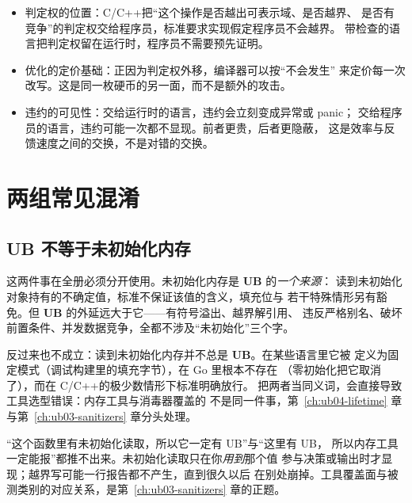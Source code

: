 \documentclass[12pt,a4paper,fontset=fandol]{ctexbook}
\newcommand{\Lang}[1]{\textsf{#1}}
\newcommand{\CL}{\Lang{C}}
\newcommand{\CPP}{\Lang{C++}}
\newcommand{\UB}{\textbf{\textsf{UB}}}
\begin{document}
\begin{compare}[title={C/C++ 特殊在哪里：不是有 UB，而是谁说了算}]
\begin{itemize}
  \item 判定权的位置：\CL/\CPP 把“这个操作是否越出可表示域、是否越界、
        是否有竞争”的判定权交给程序员，标准要求实现假定程序员不会越界。
        带检查的语言把判定权留在运行时，程序员不需要预先证明。
  \item 优化的定价基础：正因为判定权外移，编译器可以按“不会发生”
        来定价每一次改写。这是同一枚硬币的另一面，而不是额外的攻击。
  \item 违约的可见性：交给运行时的语言，违约会立刻变成异常或 panic；
        交给程序员的语言，违约可能一次都不显现。前者更贵，后者更隐蔽，
        这是效率与反馈速度之间的交换，不是对错的交换。
\end{itemize}
\end{compare}

\section{两组常见混淆}\label{sec:ub02-confusions}

\subsection{UB 不等于未初始化内存}\label{sec:ub02-not-uninit}

这两件事在全册必须分开使用。未初始化内存是 \UB{} 的\emph{一个来源}：
读到未初始化对象持有的不确定值，标准不保证该值的含义，填充位与
若干特殊情形另有豁免。但 \UB{} 的外延远大于它——有符号溢出、越界解引用、
违反严格别名、破坏前置条件、并发数据竞争，全都不涉及“未初始化”三个字。

反过来也不成立：读到未初始化内存并不总是 \UB{}。在某些语言里它被
定义为固定模式（调试构建里的填充字节），在 \Lang{Go} 里根本不存在
（零初始化把它取消了），而在 \CL/\CPP 的极少数情形下标准明确放行。
把两者当同义词，会直接导致工具选型错误：内存工具与消毒器覆盖的
不是同一件事，第~\ref{ch:ub04-lifetime} 章与第~\ref{ch:ub03-sanitizers} 章分头处理。

\begin{warning}[title={混淆的第一个症状：把 msan 当 ubsan 用}]
“这个函数里有未初始化读取，所以它一定有 UB”与“这里有 UB，
所以内存工具一定能报”都推不出来。未初始化读取只在你\emph{用到}那个值
参与决策或输出时才显现；越界写可能一行报告都不产生，直到很久以后
在别处崩掉。工具覆盖面与被测类别的对应关系，是第~\ref{ch:ub03-sanitizers} 章的正题。
\end{warning}
\end{document}
